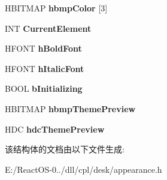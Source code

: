 \begin{DoxyCompactItemize}
H\+B\+I\+T\+M\+AP {\bfseries hbmp\+Color} \mbox{[}3\mbox{]}
\item 
\mbox{\label{structtag_g_l_o_b_a_l_s_a396499eec1fb3f27076f40d7c898a610}} 
I\+NT {\bfseries Current\+Element}
\item 
\mbox{\label{structtag_g_l_o_b_a_l_s_af0780ff8f0222f872c7cbdcb2ac28915}} 
H\+F\+O\+NT {\bfseries h\+Bold\+Font}
\item 
\mbox{\label{structtag_g_l_o_b_a_l_s_aa64916a799bf05b5a48e42107c95edcf}} 
H\+F\+O\+NT {\bfseries h\+Italic\+Font}
\item 
\mbox{\label{structtag_g_l_o_b_a_l_s_a1dadd83c9600afd0275cfa3b31355c41}} 
B\+O\+OL {\bfseries b\+Initializing}
\item 
\mbox{\label{structtag_g_l_o_b_a_l_s_a58b8621e6ecec8cc7b463b46f5508acf}} 
H\+B\+I\+T\+M\+AP {\bfseries hbmp\+Theme\+Preview}
\item 
\mbox{\label{structtag_g_l_o_b_a_l_s_a67c09733afbdcb584466473a1de140a9}} 
H\+DC {\bfseries hdc\+Theme\+Preview}
\end{DoxyCompactItemize}


该结构体的文档由以下文件生成\+:\begin{DoxyCompactItemize}
\item 
E\+:/\+React\+O\+S-\/0../dll/cpl/desk/appearance.\+h\end{DoxyCompactItemize}
